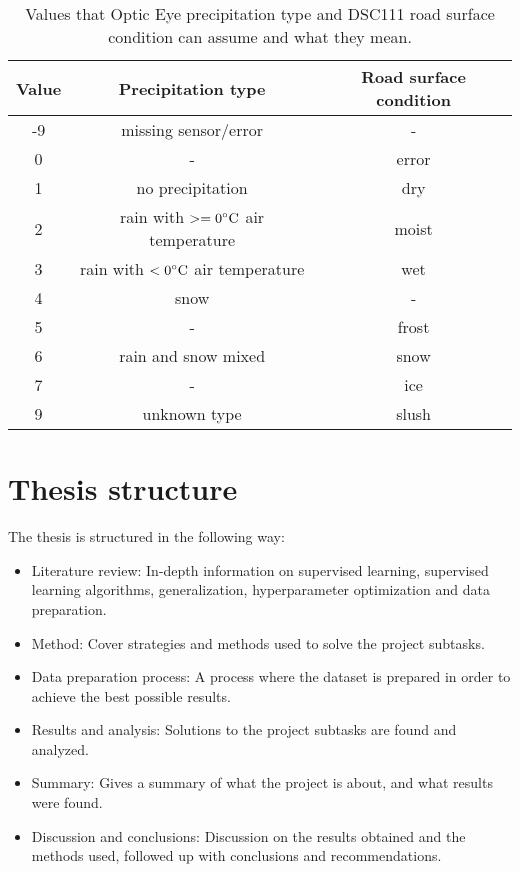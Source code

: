 \begin{table}[H]
	\centering
	\caption{Values that Optic Eye precipitation type and DSC111 road surface condition can assume and what they mean.}
		\begin{tabular}[3]{c | c | c}
    			Value & Precipitation type & Road surface condition \\
    			\hline
			-9 & missing sensor/error & - \\
			0 & - & error\\
			1 & no precipitation & dry \\
			2 & rain with $>= 0 \celsius$ air temperature & moist \\
			3 & rain with $< 0 \celsius$ air temperature & wet \\
			4 & snow & - \\
			5 & - & frost \\
			6 & rain and snow mixed  & snow \\
			7 & - & ice \\
			9 & unknown type  & slush 
			\label{table:discretevalues}
		\end{tabular}
\end{table}

\section{Thesis structure}
	The thesis is structured in the following way:
	\begin{itemize}
		\item{Literature review:} In-depth information on supervised learning, supervised learning algorithms, generalization, hyperparameter optimization and data preparation.
		\item{Method:} Cover strategies and methods used to solve the project subtasks.
		\item{Data preparation process:} A process where the dataset is prepared in order to achieve the best possible results.
		\item{Results and analysis:} Solutions to the project subtasks are found and analyzed.
		\item{Summary:} Gives a summary of what the project is about, and what results were found.
		\item{Discussion and conclusions:} Discussion on the results obtained and the methods used, followed up with conclusions and recommendations.
	\end{itemize}
